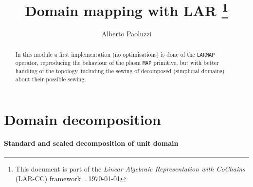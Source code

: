 \documentclass[11pt,oneside]{article}	%
\title{Domain mapping with LAR
\footnote{This document is part of the \emph{Linear Algebraic Representation with CoChains} (LAR-CC) framework~\cite{cclar-proj:2013:00}. \today}
}
\author{Alberto Paoluzzi}
\begin{document}
\maketitle
\nonstopmode

\begin{abstract}
In this module a first implementation (no optimisations) is done of the \texttt{LARMAP} operator, reproducing the behaviour of the plasm \texttt{MAP} primitive, but with better handling of the topology, including the sewing of decomposed (simplicial domains) about their possible sewing.
\end{abstract}

\tableofcontents

\section{Domain decomposition}

\paragraph{Standard and scaled decomposition of unit domain}
\end{document}
